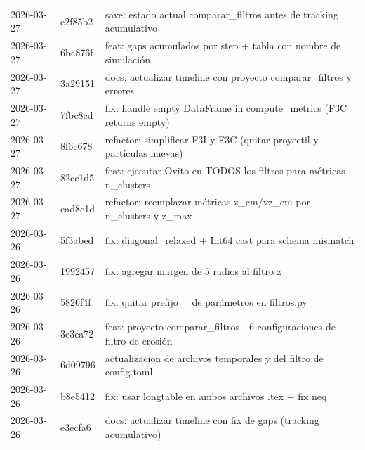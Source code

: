 \documentclass[12pt,a4paper]{article}
\begin{document}
\begin{longtable}{@{}llp{10cm}@{}}
	2026-03-27     & e2f85b2         & save: estado actual comparar\_filtros antes de tracking acumulativo                                                   \\
	2026-03-27     & 6bc876f         & feat: gaps acumulados por step + tabla con nombre de simulación                                                       \\
	2026-03-27     & 3a29151         & docs: actualizar timeline con proyecto comparar\_filtros y errores                                                    \\
	2026-03-27     & 7fbc8cd         & fix: handle empty DataFrame in compute\_metrics (F3C returns empty)                                                   \\
	2026-03-27     & 8f6c678         & refactor: simplificar F3I y F3C (quitar proyectil y partículas nuevas)                                                \\
	2026-03-27     & 82cc1d5         & feat: ejecutar Ovito en TODOS los filtros para métricas n\_clusters                                                   \\
	2026-03-27     & cad8c1d         & refactor: reemplazar métricas z\_cm/vz\_cm por n\_clusters y z\_max                                                   \\
	2026-03-26     & 5f3abed         & fix: diagonal\_relaxed + Int64 cast para schema mismatch                                                              \\
	2026-03-26     & 1992457         & fix: agregar margen de 5 radios al filtro z                                                                           \\
	2026-03-26     & 5826f4f         & fix: quitar prefijo \_ de parámetros en filtros.py                                                                    \\
	2026-03-26     & 3e3ea72         & feat: proyecto comparar\_filtros - 6 configuraciones de filtro de erosión                                             \\
	2026-03-26     & 6d09796         & actualizacion de archivos temporales y del filtro de config.toml                                                      \\
	2026-03-26     & b8e5412         & fix: usar longtable en ambos archivos .tex + fix neq                                                                  \\
	2026-03-26     & e3ecfa6         & docs: actualizar timeline con fix de gaps (tracking acumulativo)                                                      \\

\end{longtable}
\end{document}
